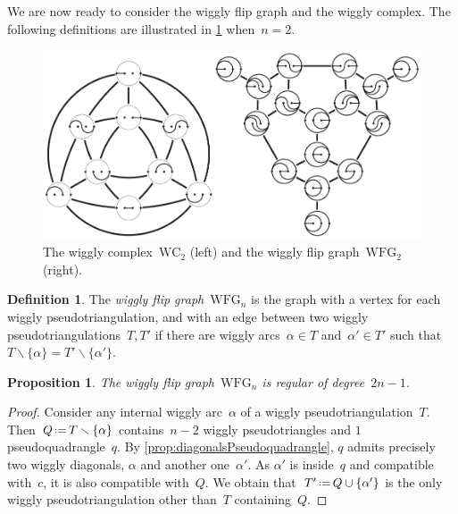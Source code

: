 \documentclass{amsart}
\newtheorem{proposition}[theorem]{Proposition}
\theoremstyle{definition}
\newtheorem{definition}[theorem]{Definition}
\newcommand{\ssm}{\smallsetminus} %
\newcommand{\eqdef}{\mbox{\,\raisebox{0.2ex}{\scriptsize\ensuremath{\mathrm:}}\ensuremath{=}\,}} %
\newcommand{\darkblue}{\color{darkblue}} %
\newcommand{\defn}[1]{\textsl{\darkblue #1}} %
\newcommand{\vincent}[1]{\todo[color=blue!30]{\rm #1 \\ \hfill --- V.}}
\newcommand{\wigglyComplex}{\mathrm{WC}} %
\newcommand{\wigglyFlipGraph}{\mathrm{WFG}} %
\begin{document}

We are now ready to consider the wiggly flip graph and the wiggly complex.
The following definitions are illustrated in \cref{fig:wigglyComplex} when~$n = 2$.
%
\begin{figure}
\centerline{\includegraphics[scale=1.1]{wigglyComplex}}
\caption{The wiggly complex~$\wigglyComplex_2$ (left) and the wiggly flip graph~$\wigglyFlipGraph_2$ (right).}
\label{fig:wigglyComplex}
\end{figure}

\begin{definition}
\label{def:wigglyFlipGraph}
The \defn{wiggly flip graph}~$\wigglyFlipGraph_n$ is the graph with a vertex for each wiggly pseudotriangulation, and with an edge between two wiggly pseudotriangulations~$T,T'$ if there are wiggly arcs~$\alpha \in T$ and~$\alpha' \in T'$ such that~$T \ssm \{\alpha\} = T' \ssm \{\alpha'\}$.
\end{definition}

\pagebreak
\begin{proposition}
\label{prop:wigglyFlipGraph}
The wiggly flip graph~$\wigglyFlipGraph_n$ is regular of degree~$2n-1$.
\end{proposition}

\begin{proof}
Consider any internal wiggly arc~$\alpha$ of a wiggly pseudotriangulation~$T$.
Then~$Q \eqdef T \ssm \{\alpha\}$ contains~$n-2$ wiggly pseudotriangles and $1$ pseudoquadrangle~$q$.
By \cref{prop:diagonalsPseudoquadrangle}, $q$ admits precisely two wiggly diagonals, $\alpha$ and another one~$\alpha'$.
As $\alpha'$ is inside~$q$ and compatible with~$c$, it is also compatible with~$Q$.
We obtain that~$T' \eqdef Q \cup \{\alpha'\}$ is the only wiggly pseudotriangulation other than~$T$ containing~$Q$.
\end{proof}
\end{document}
